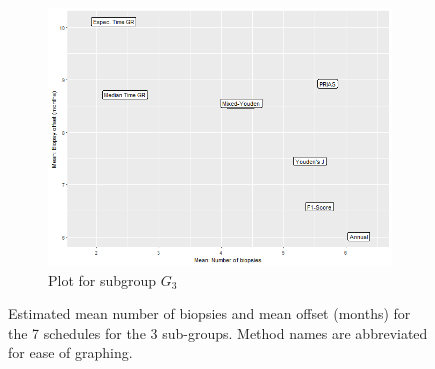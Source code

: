 \begin{figure}[!htb]
\begin{subfigure}[b]{0.45\textwidth}
		\includegraphics[width=\textwidth]{images/sim_study/meanNbVsOffset_scale_6.png}
		\caption{Plot for subgroup $G_3$}
		\label{fig : meanNbVsOffset_G3}
    \end{subfigure}      
    \caption{Estimated mean number of biopsies and mean offset (months) for the 7 schedules for the 3 sub-groups. Method names are abbreviated for ease of graphing.}
\end{figure}

